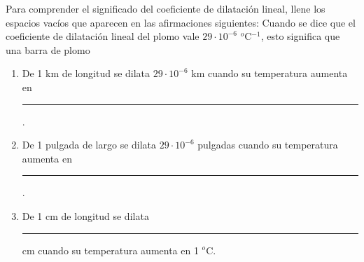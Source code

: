
Para comprender el significado del coeficiente de dilatación lineal, llene los espacios vacíos que aparecen en las afirmaciones siguientes: Cuando se dice que el coeficiente de dilatación lineal del plomo vale $29 \cdot 10^{-6}$ $^{o}$C$^{-1}$, esto significa que una barra de plomo
\begin{enumerate}
    \item De 1 km de longitud se dilata $29 \cdot 10^{-6}$ km cuando su temperatura aumenta en \rule{60mm}{0.1mm}.
    \item De 1 pulgada de largo se dilata $29 \cdot 10^{-6}$ pulgadas cuando su temperatura aumenta en \rule{60mm}{0.1mm}.
    \item De 1 cm de longitud se dilata \rule{20mm}{0.1mm} cm cuando su temperatura aumenta en 1 $^o$C.
\end{enumerate}
